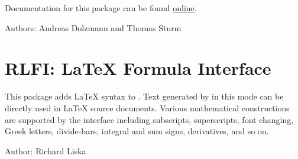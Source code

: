 Documentation for this package can be found \href{http://redlog.eu/}{online}.

Authors: Andreas Dolzmann and Thomas Sturm


\iffalse
\section{RESET: Code to Reset \REDUCE to its Initial State}
\indexpackage{RESET}

This package defines a command RESETREDUCE that works through the
history of previous commands, and clears any values which have been
assigned, plus any rules, arrays and the like.  It also sets the various
switches to their initial values.  It is not complete, but does work for
most things that cause a gradual loss of space.  It would be relatively
easy to make it interactive, so allowing for selective resetting.

There is no further documentation on this package.

Author: John Fitch

\fi

\newpage
\iffalse
\section{RESIDUE: A Residue Package}
\indexpackage{RESIDUE}

This package supports the calculation of residues of arbitrary
expressions.

Author: Wolfram Koepf


\fi

\newpage

\section{RLFI: \REDUCE \LaTeX{} Formula Interface}

This package adds \LaTeX{} syntax to \REDUCE.  Text generated by \REDUCE in
this mode can be directly used in \LaTeX{} source documents.  Various
mathematical constructions are supported by the interface including
subscripts, superscripts, font changing, Greek letters, divide-bars,
integral and sum signs, derivatives, and so on.

Author: Richard Liska


